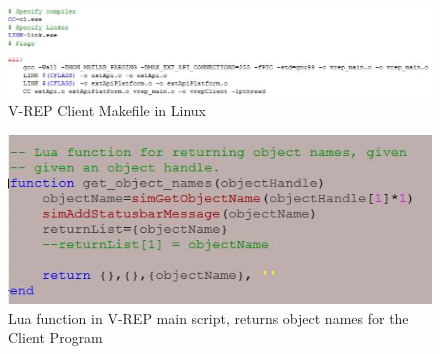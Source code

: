 \documentclass[12pt,openany,a4paper]{book}
\begin{document}
\vspace{\baselineskip}

\begin{center}
\begin{figure}[htb]
  \includegraphics[width=1.1\linewidth]{makefile.jpg}
\caption{V-REP Client Makefile in Linux}
\end{figure}
\end{center}

\vspace{\baselineskip}

\begin{center}
\begin{figure}[htb]
  \includegraphics[width=0.8\linewidth]{object_names.jpg}
\caption{Lua function in V-REP main script, returns object names for the Client Program}
\end{figure}
\end{center}

\vspace{\baselineskip}
\end{document}
